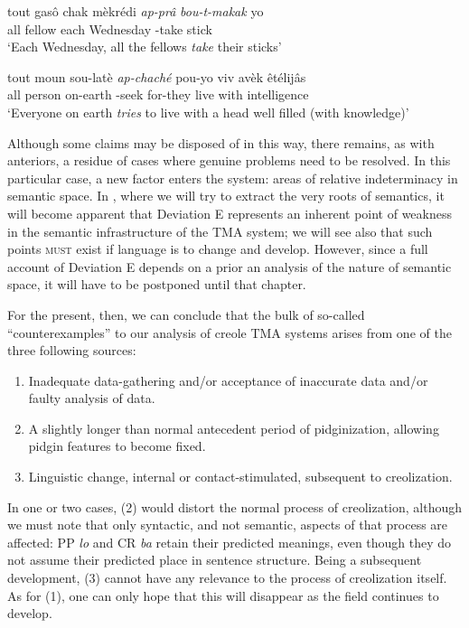 \ea\label{ex:2:123}
 \gll tout gasô chak mèkrédi \textit{ap-prâ} \textit{bou-t-makak} yo\\
all fellow each Wednesday \ASP-take stick {\PL}\\
\glt `Each Wednesday, all the fellows \textit{take} their sticks'
\z

\ea\label{ex:2:124}
\gll tout moun sou-latè \textit{ap-chaché} pou-yo viv avèk êtélijâs\\
all person on-earth \ASP-seek for-they live with intelligence\\
\glt `Everyone on earth \textit{tries} to live with a head well filled (with knowledge)'
\z

Although some claims may be disposed of in this way, there remains, as with anteriors, a residue of cases where genuine problems need to be resolved. In this particular case, a new factor enters the system: areas of relative indeterminacy in semantic space. In , where we will try to extract the very roots of semantics, it will become apparent that Deviation E represents an inherent point of weakness in the semantic infrastructure of the TMA system; we will see also that such points \textsc{must} exist if language is to change and develop. However, since a full account of Deviation E depends on a prior an analysis of the nature of semantic space, it will have to be postponed until that chapter.

For the present, then, we can conclude that the bulk of so-called ``counterexamples'' to our analysis of creole TMA systems arises from one of the three following sources:

\begin{enumerate}
\item Inadequate data-gathering and/or acceptance of inaccurate data and/or faulty analysis of data.
\item A slightly longer than normal antecedent period of pidginization, allowing pidgin features to become fixed.
\item Linguistic change, internal or contact-stimulated, subsequent to creolization.
\end{enumerate}
In one or two cases, (2) would distort the normal process of creolization, although we must note that only syntactic, and not semantic, aspects of that process are affected: PP \textit{lo} and CR \textit{ba} retain their predicted meanings, even though they do not assume their predicted place in sentence structure. Being a subsequent development, (3) cannot have any relevance to the process of creolization itself. As for (1), one can only hope that this will disappear as the field continues to develop.\\\\

